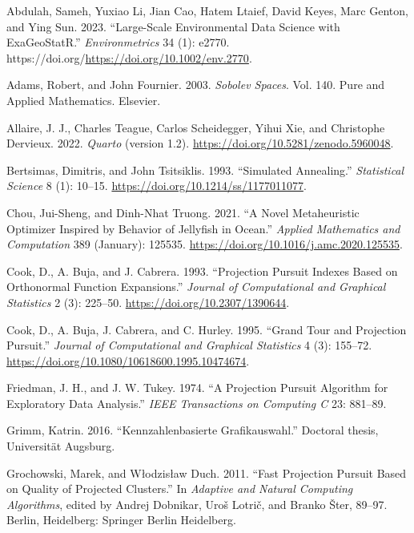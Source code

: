 \documentclass[
  12pt,
]{interact}
\newlength{\cslhangindent}
\newenvironment{CSLReferences}[2] %
 {\begin{list}{}{%
  \setlength{\itemindent}{0pt}
  \setlength{\leftmargin}{0pt}
  \setlength{\parsep}{0pt}
  \ifodd #1
   \setlength{\leftmargin}{\cslhangindent}
   \setlength{\itemindent}{-1\cslhangindent}
  \fi
  \setlength{\itemsep}{#2\baselineskip}}}
 {\end{list}}
\theoremstyle{plain}
\begin{document}
\label{refs}
\begin{CSLReferences}{1}{0}
Abdulah, Sameh, Yuxiao Li, Jian Cao, Hatem Ltaief, David Keyes, Marc
Genton, and Ying Sun. 2023. {``Large-Scale Environmental Data Science
with {ExaGeoStatR}.''} \emph{Environmetrics} 34 (1): e2770.
https://doi.org/\url{https://doi.org/10.1002/env.2770}.

Adams, Robert, and John Fournier. 2003. \emph{Sobolev Spaces}. Vol. 140.
Pure and Applied Mathematics. Elsevier.

Allaire, J. J., Charles Teague, Carlos Scheidegger, Yihui Xie, and
Christophe Dervieux. 2022. \emph{{Quarto}} (version 1.2).
\url{https://doi.org/10.5281/zenodo.5960048}.

Bertsimas, Dimitris, and John Tsitsiklis. 1993. {``{Simulated
Annealing}.''} \emph{Statistical Science} 8 (1): 10--15.
\url{https://doi.org/10.1214/ss/1177011077}.

Chou, Jui-Sheng, and Dinh-Nhat Truong. 2021. {``A Novel Metaheuristic
Optimizer Inspired by Behavior of Jellyfish in Ocean.''} \emph{Applied
Mathematics and Computation} 389 (January): 125535.
\url{https://doi.org/10.1016/j.amc.2020.125535}.

Cook, D., A. Buja, and J. Cabrera. 1993. {``Projection Pursuit Indexes
Based on Orthonormal Function Expansions.''} \emph{Journal of
Computational and Graphical Statistics} 2 (3): 225--50.
\url{https://doi.org/10.2307/1390644}.

Cook, D., A. Buja, J. Cabrera, and C. Hurley. 1995. {``Grand Tour and
Projection Pursuit.''} \emph{Journal of Computational and Graphical
Statistics} 4 (3): 155--72.
\url{https://doi.org/10.1080/10618600.1995.10474674}.

Friedman, J. H., and J. W. Tukey. 1974. {``{A} {P}rojection {P}ursuit
{A}lgorithm for {E}xploratory {D}ata {A}nalysis.''} \emph{IEEE
Transactions on Computing C} 23: 881--89.

Grimm, Katrin. 2016. {``Kennzahlenbasierte Grafikauswahl.''} Doctoral
thesis, Universit{ä}t Augsburg.

Grochowski, Marek, and Włodzisław Duch. 2011. {``Fast Projection Pursuit
Based on Quality of Projected Clusters.''} In \emph{Adaptive and Natural
Computing Algorithms}, edited by Andrej Dobnikar, Uroš Lotrič, and
Branko Šter, 89--97. Berlin, Heidelberg: Springer Berlin Heidelberg.


\end{CSLReferences}
\end{document}
